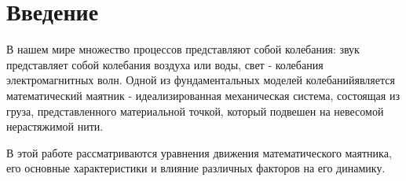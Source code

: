 \section{Введение}
В нашем мире множество процессов представляют собой колебания: 
звук представляет собой колебания воздуха или воды, свет - колебания электромагнитных волн. 
Одной из фундаментальных моделей  колебанийявляется математический маятник - идеализированная механическая система, состоящая из груза, представленного материальной точкой, который подвешен на невесомой нерастяжимой нити.

В этой работе рассматриваются уравнения движения математического маятника, его основные характеристики и влияние различных факторов на его динамику.